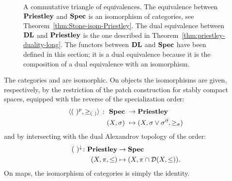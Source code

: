 \begin{figure}[htp]
\begin{center}
\caption{A commutative triangle of equivalences. The equivalence between $\mathbf{Priestley}$ and $\mathbf{Spec}$ is an isomorphism of categories, see Theorem~\ref{thm:Stone-isom-Priestley}. The dual equivalence between $\mathbf{DL}$ and $\mathbf{Priestley}$ is the one described in Theorem~\ref{thm:priestley-duality-long}. The functors  between $\mathbf{DL}$ and $\mathbf{Spec}$ have been defined in this section; it is a dual equivalence because it is the composition of a dual equivalence with an isomorphism.}
\label{fig:dl-priest-spec-diagram}
\end{center}
\end{figure}



\begin{theorem}\label{thm:Stone-isom-Priestley}
  The categories {\Spec} and {\Priest} are isomorphic. On objects the isomorphisms are given, respectively, by the restriction of the patch construction for stably compact spaces, equipped with the reverse of the specialization order:
  \begin{align*}
    \langle(\ )^{p},\geq_{(\ )}\rangle \ \colon \ {\mathbf{Spec}}\  & \to {\ensuremath{\mathbf{Priestley}}}\\
             (X,\sigma)\  & \mapsto (X,\sigma\vee\sigma^\partial, \geq_\sigma)
  \end{align*}
  and by intersecting with the dual Alexandrov topology of the order:
  \begin{align*}
  (\ )^{\downarrow}\colon {\ensuremath{\mathbf{Priestley}}} & \to {\ensuremath{\mathbf{Spec}}}\\
             (X,\pi,\leq) & \mapsto (X,\pi\cap \mathcal{D}(X,\leq)).
  \end{align*}
  On maps, the isomorphism of categories is simply the identity.
  \end{theorem}
  
